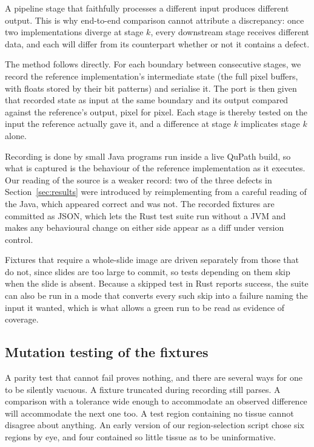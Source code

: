 \documentclass[11pt,a4paper]{article}
\begin{document}
A pipeline stage that faithfully processes a different input produces different
output. This is why end-to-end comparison cannot attribute a discrepancy: once
two implementations diverge at stage $k$, every downstream stage receives
different data, and each will differ from its counterpart whether or not it
contains a defect.

The method follows directly. For each boundary between consecutive stages, we
record the reference implementation's intermediate state (the full pixel
buffers, with floats stored by their bit patterns) and serialise it. The port
is then given that recorded state as input at the same boundary and its output
compared against the reference's output, pixel for pixel. Each stage is thereby
tested on the input the reference actually gave it, and a difference at stage
$k$ implicates stage $k$ alone.

Recording is done by small Java programs run inside a live QuPath build, so
what is captured is the behaviour of the reference implementation as it
executes. Our reading of the source is a weaker record: two of the three
defects in Section~\ref{sec:results} were introduced by reimplementing from a
careful reading of the Java, which appeared correct and was not. The recorded
fixtures are committed as JSON, which lets the Rust test suite run without a
JVM and makes any behavioural change on either side appear as a diff under
version control.

Fixtures that require a whole-slide image are driven separately from those that
do not, since slides are too large to commit, so tests depending on them skip
when the slide is absent. Because a skipped test in Rust reports success, the
suite can also be run in a mode that converts every such skip into a failure
naming the input it wanted, which is what allows a green run to be read as
evidence of coverage.

\subsection{Mutation testing of the fixtures}

A parity test that cannot fail proves nothing, and there are several ways for
one to be silently vacuous. A fixture truncated during recording still parses.
A comparison with a tolerance wide enough to accommodate an observed difference
will accommodate the next one too. A test region containing no tissue cannot
disagree about anything. An early version of our region-selection script chose
six regions by eye, and four contained so little tissue as to be uninformative.
\end{document}

